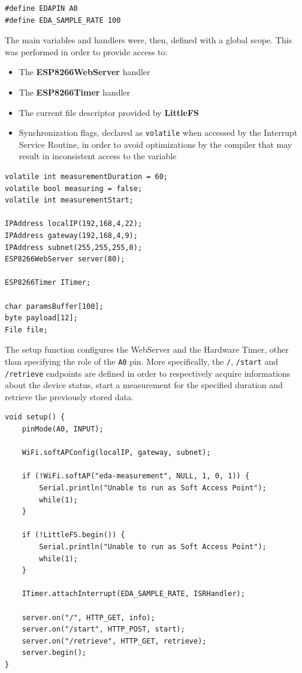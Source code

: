 \begin{verbatim}
#define EDAPIN A0
#define EDA_SAMPLE_RATE 100
\end{verbatim}

The main variables and handlers were, then, defined with a global scope. This was performed in order to provide access to:

\begin{itemize}
    \item The \textbf{ESP8266WebServer} handler
    \item The \textbf{ESP8266Timer} handler
    \item The current file descriptor provided by \textbf{LittleFS}
    \item Synchronization flags, declared as \texttt{volatile} when accessed by the Interrupt Service Routine, in order to avoid optimizations by the compiler that may result in inconsistent access to the variable
\end{itemize}


\begin{verbatim}
volatile int measurementDuration = 60;
volatile bool measuring = false;
volatile int measurementStart;

IPAddress localIP(192,168,4,22);
IPAddress gateway(192,168,4,9);
IPAddress subnet(255,255,255,0);
ESP8266WebServer server(80);

ESP8266Timer ITimer;

char paramsBuffer[100];
byte payload[12];
File file;
\end{verbatim}

The setup function configures the WebServer and the Hardware Timer, other than specifying the role of the \texttt{A0} pin. More specifically, the \texttt{/}, \texttt{/start} and \texttt{/retrieve} endpoints are defined in order to respectively acquire informations about the device status, start a measurement for the specified duration and retrieve the previously stored data.

\begin{verbatim}
void setup() {
    pinMode(A0, INPUT);

    WiFi.softAPConfig(localIP, gateway, subnet);
    
    if (!WiFi.softAP("eda-measurement", NULL, 1, 0, 1)) {
        Serial.println("Unable to run as Soft Access Point");
        while(1);
    }

    if (!LittleFS.begin()) {
        Serial.println("Unable to run as Soft Access Point");
        while(1);
    }

    ITimer.attachInterrupt(EDA_SAMPLE_RATE, ISRHandler);

    server.on("/", HTTP_GET, info);
    server.on("/start", HTTP_POST, start);
    server.on("/retrieve", HTTP_GET, retrieve);
    server.begin();
}
\end{verbatim}

